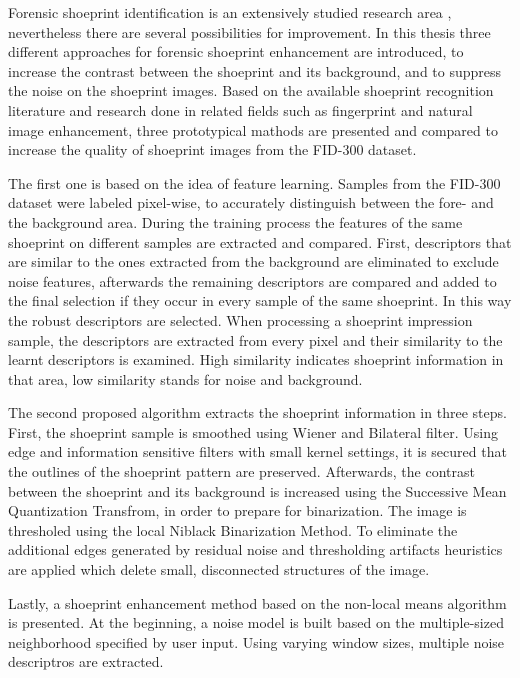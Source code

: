 \documentclass[draft,final]{vutinfth} %
\begin{document}
\par
Forensic shoeprint identification is an extensively studied research area \cite{rida2019forensic}, nevertheless there are several possibilities for improvement.
In this thesis three different approaches for forensic shoeprint enhancement are introduced, to increase the contrast between the shoeprint and its background, and to suppress the noise on the shoeprint images.
Based on the available shoeprint recognition literature and research done in related fields such as fingerprint and natural image enhancement, three prototypical mathods are presented and compared to increase the quality of shoeprint images from the FID-300 dataset.
\par
The first one is based on the idea of feature learning.
Samples from the FID-300 dataset were labeled pixel-wise, to accurately distinguish between the fore- and the background area.
During the training process the features of the same shoeprint on different samples are extracted and compared.
First, descriptors that are similar to the ones extracted from the background are eliminated to exclude noise features, afterwards the remaining descriptors are compared and added to the final selection if they occur in every sample of the same shoeprint.
In this way the robust descriptors are selected.
When processing a shoeprint impression sample, the descriptors are extracted from every pixel and their similarity to the learnt descriptors is examined.
High similarity indicates shoeprint information in that area, low similarity stands for noise and background.
\par
The second proposed algorithm extracts the shoeprint information in three steps.
First, the shoeprint sample is smoothed using Wiener and Bilateral filter.
Using edge and information sensitive filters with small kernel settings, it is secured that the outlines of the shoeprint pattern are preserved.
Afterwards, the contrast between the shoeprint and its background is increased using the Successive Mean Quantization Transfrom, in order to prepare for binarization.
The image is thresholed using the local Niblack Binarization Method.
To eliminate the additional edges generated by residual noise and thresholding artifacts heuristics are applied which delete small, disconnected structures of the image.
\par
Lastly, a shoeprint enhancement method based on the non-local means algorithm is presented.
At the beginning, a noise model is built based on the multiple-sized neighborhood specified by user input.
Using varying window sizes, multiple noise descriptros are extracted.
\end{document}
